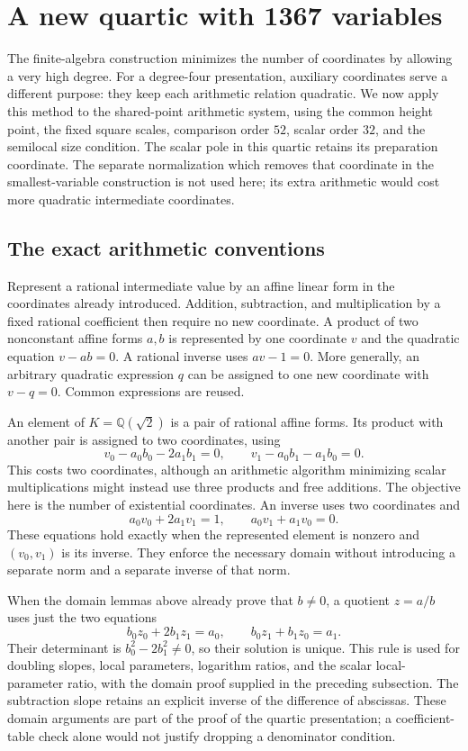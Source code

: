 \section{A new quartic with 1367 variables}
\label{sec:new-quartic}

The finite-algebra construction minimizes the number of coordinates by
allowing a very high degree.  For a degree-four presentation, auxiliary
coordinates serve a different purpose: they keep each arithmetic relation
quadratic.  We now apply this method to the shared-point arithmetic system,
using the common height point, the fixed square scales, comparison order
$52$, scalar order $32$, and the semilocal size condition.  The scalar pole
in this quartic retains its preparation coordinate.  The separate
normalization which removes that coordinate in the smallest-variable
construction is not used here; its extra arithmetic would cost more
quadratic intermediate coordinates.

\subsection{The exact arithmetic conventions}

Represent a rational intermediate value by an affine linear form in the
coordinates already introduced.  Addition, subtraction, and multiplication
by a fixed rational coefficient then require no new coordinate.  A product
of two nonconstant affine forms $a,b$ is represented by one coordinate $v$
and the quadratic equation $v-ab=0$.  A rational inverse uses $av-1=0$.
More generally, an arbitrary quadratic expression $q$ can be assigned to
one new coordinate with $v-q=0$.  Common expressions are reused.

An element of $K=\mathbb Q(\sqrt2)$ is a pair of rational affine forms.
Its product with another pair is assigned to two coordinates, using
\[
 v_0-a_0b_0-2a_1b_1=0,\qquad
 v_1-a_0b_1-a_1b_0=0.
\]
This costs two coordinates, although an arithmetic algorithm minimizing
scalar multiplications might instead use three products and free additions.
The objective here is the number of existential coordinates.  An inverse
uses two coordinates and
\[
 a_0v_0+2a_1v_1=1,\qquad a_0v_1+a_1v_0=0.
\]
These equations hold exactly when the represented element is nonzero and
$(v_0,v_1)$ is its inverse.  They enforce the necessary domain without
introducing a separate norm and a separate inverse of that norm.

When the domain lemmas above already prove that $b\ne0$, a quotient
$z=a/b$ uses just the two equations
\[
 b_0z_0+2b_1z_1=a_0,\qquad b_0z_1+b_1z_0=a_1.
\]
Their determinant is $b_0^2-2b_1^2\ne0$, so their solution is unique.
This rule is used for doubling slopes, local parameters, logarithm ratios,
and the scalar local-parameter ratio, with the domain proof supplied in
the preceding subsection.  The subtraction slope retains an explicit
inverse of the difference of abscissas.  These domain arguments are part
of the proof of the quartic presentation; a coefficient-table check alone
would not justify dropping a denominator condition.

